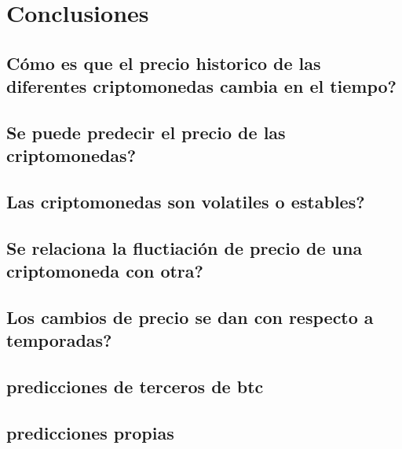 \documentclass[12pt,letterpaper]{article}
\begin{document}
\section*{Conclusiones}

	\subsection*{Cómo es que el precio historico de las diferentes criptomonedas cambia en el tiempo?}
	\subsection*{Se puede predecir el precio de las criptomonedas?}
	\subsection*{Las criptomonedas son volatiles o estables?}
	\subsection*{Se relaciona la fluctiación de precio de una criptomoneda con otra?}
	\subsection*{Los cambios de precio se dan con respecto a temporadas?}
	\subsection*{predicciones de terceros de btc}
	\subsection*{predicciones propias}
\end{document}
